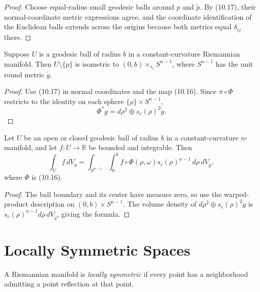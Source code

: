 \begin{proof}
\sketch
Choose equal-radius small geodesic balls around $p$ and $\widetilde p$.  By
(10.17), their normal-coordinate metric expressions agree, and the coordinate
identification of the Euclidean balls extends across the origins because both
metrics equal $\delta_{ij}$ there.
\end{proof}

\begin{corollary}
\label{cor:constant-curvature-warped-products}
Suppose $U$ is a geodesic ball of radius $b$ in a constant-curvature
Riemannian manifold.  Then $U\setminus\{p\}$ is isometric to
$(0,b)\times_{s_c}S^{n-1}$, where $S^{n-1}$ has the unit round metric
$\check g$.
\end{corollary}

\begin{proof}
\sketch
Use (10.17) in normal coordinates and the map (10.16).  Since
$\pi\circ\Phi$ restricts to the identity on each sphere
$\{\rho\}\times S^{n-1}$,
\[
\Phi^*g=d\rho^2\oplus s_c(\rho)^2\check g.
\]
\end{proof}

\begin{corollary}
\label{cor:polar-decomposition-integrals}

Let $U$ be an open or closed geodesic ball of radius $b$ in a
constant-curvature $n$-manifold, and let $f:U\to\mathbb R$ be bounded and
integrable.  Then
\[
\int_U f\,dV_g
=\int_{S^{n-1}}\int_0^b f\circ\Phi(\rho,\omega)
s_c(\rho)^{n-1}\,d\rho\,dV_{\check g},
\]
where $\Phi$ is (10.16).
\end{corollary}

\begin{proof}
\sketch
The ball boundary and its center have measure zero, so use the warped-product
description on $(0,b)\times S^{n-1}$.  The volume density of
$d\rho^2\oplus s_c(\rho)^2\check g$ is
$s_c(\rho)^{n-1}d\rho\,dV_{\check g}$, giving the formula.
\end{proof}
\section{Locally Symmetric Spaces}

A Riemannian manifold is \emph{locally symmetric} if every point has a
neighborhood admitting a point reflection at that point.

